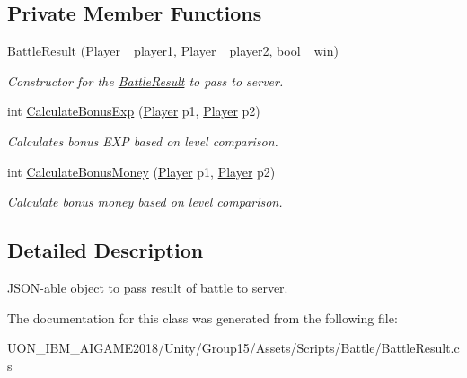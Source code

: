 \subsection*{Private Member Functions}
\begin{DoxyCompactItemize}
\item 
\mbox{\label{class_battle_result_aa9b8da5a628723badc34d0828591ff0a}} 
\mbox{\hyperlink{class_battle_result_aa9b8da5a628723badc34d0828591ff0a}{Battle\+Result}} (\mbox{\hyperlink{class_player}{Player}} \+\_\+player1, \mbox{\hyperlink{class_player}{Player}} \+\_\+player2, bool \+\_\+win)
\begin{DoxyCompactList}\small\item\em Constructor for the \mbox{\hyperlink{class_battle_result}{Battle\+Result}} to pass to server. \end{DoxyCompactList}\item 
\mbox{\label{class_battle_result_af20191426878f7be611049a4715dcfbd}} 
int \mbox{\hyperlink{class_battle_result_af20191426878f7be611049a4715dcfbd}{Calculate\+Bonus\+Exp}} (\mbox{\hyperlink{class_player}{Player}} p1, \mbox{\hyperlink{class_player}{Player}} p2)
\begin{DoxyCompactList}\small\item\em Calculates bonus E\+XP based on level comparison. \end{DoxyCompactList}\item 
\mbox{\label{class_battle_result_ad5eed686021435525855eb55902be318}} 
int \mbox{\hyperlink{class_battle_result_ad5eed686021435525855eb55902be318}{Calculate\+Bonus\+Money}} (\mbox{\hyperlink{class_player}{Player}} p1, \mbox{\hyperlink{class_player}{Player}} p2)
\begin{DoxyCompactList}\small\item\em Calculate bonus money based on level comparison. \end{DoxyCompactList}\end{DoxyCompactItemize}


\subsection{Detailed Description}
J\+S\+O\+N-\/able object to pass result of battle to server. 

The documentation for this class was generated from the following file\+:\begin{DoxyCompactItemize}
\item 
U\+O\+N\+\_\+\+I\+B\+M\+\_\+\+A\+I\+G\+A\+M\+E2018/\+Unity/\+Group15/\+Assets/\+Scripts/\+Battle/Battle\+Result.\+cs\end{DoxyCompactItemize}
